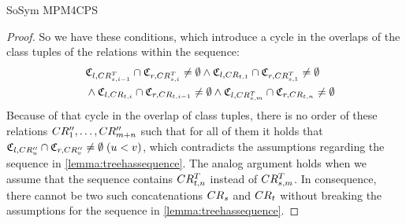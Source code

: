 \begin{copiedFrom}{SoSym MPM4CPS}
\begin{proof}
    So we have these conditions, which introduce a cycle in the overlaps of the class tuples of the relations within the sequence:
    \begin{align*}
        \formulaskip &
        \classtuple{C}{l,\consistencyrelation{CR^T}{s,i-1}} \cap \classtuple{C}{r,\consistencyrelation{CR^T}{s,i}} \neq \emptyset %
        \land
        \classtuple{C}{l,\consistencyrelation{CR}{t,1}} \cap \classtuple{C}{r,\consistencyrelation{CR^T}{s,1}} \neq \emptyset\\
        & 
        \land 
        \classtuple{C}{l,\consistencyrelation{CR}{t,i}} \cap \classtuple{C}{r,\consistencyrelation{CR}{t,i-1}} \neq \emptyset %
        \land
        \classtuple{C}{l,\consistencyrelation{CR^T}{s,m}} \cap \classtuple{C}{r,\consistencyrelation{CR}{t,n}} \neq \emptyset
    \end{align*}
    Because of that cycle in the overlap of class tuples, there is no order of these relations $CR''_{1}, \dots, CR''_{m+n}$ such that for all of them it holds that $\mathfrak{C}_{l,CR''_{u}} \cap \mathfrak{C}_{r,CR''_{v}} \neq \emptyset\; (u < v)$, which contradicts the assumptions regarding the sequence in \autoref{lemma:treehassequence}.
    The analog argument holds when we assume that the sequence contains $CR^T_{t,n}$ instead of $CR^T_{s,m}$.
    In consequence, there cannot be two such concatenations $CR_{s}$ and $CR_{t}$ without breaking the assumptions for the sequence in \autoref{lemma:treehassequence}.
\end{proof}


\end{copiedFrom}
